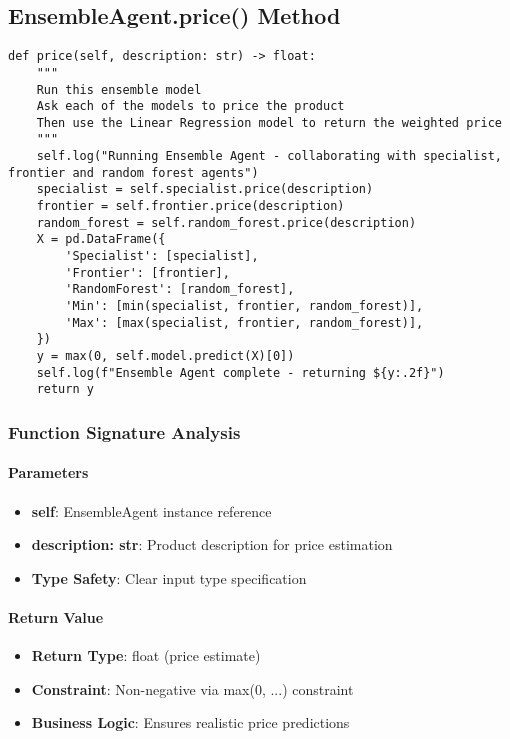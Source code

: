 \subsection{EnsembleAgent.price() Method}

\begin{lstlisting}[caption=Ensemble Price Prediction Analysis]
def price(self, description: str) -> float:
    """
    Run this ensemble model
    Ask each of the models to price the product
    Then use the Linear Regression model to return the weighted price
    """
    self.log("Running Ensemble Agent - collaborating with specialist, frontier and random forest agents")
    specialist = self.specialist.price(description)
    frontier = self.frontier.price(description)
    random_forest = self.random_forest.price(description)
    X = pd.DataFrame({
        'Specialist': [specialist],
        'Frontier': [frontier],
        'RandomForest': [random_forest],
        'Min': [min(specialist, frontier, random_forest)],
        'Max': [max(specialist, frontier, random_forest)],
    })
    y = max(0, self.model.predict(X)[0])
    self.log(f"Ensemble Agent complete - returning ${y:.2f}")
    return y
\end{lstlisting}

\subsubsection{Function Signature Analysis}

\paragraph{Parameters}
\begin{itemize}
\item \textbf{self}: EnsembleAgent instance reference
\item \textbf{description: str}: Product description for price estimation
\item \textbf{Type Safety}: Clear input type specification
\end{itemize}

\paragraph{Return Value}
\begin{itemize}
\item \textbf{Return Type}: float (price estimate)
\item \textbf{Constraint}: Non-negative via max(0, ...) constraint
\item \textbf{Business Logic}: Ensures realistic price predictions
\end{itemize}

